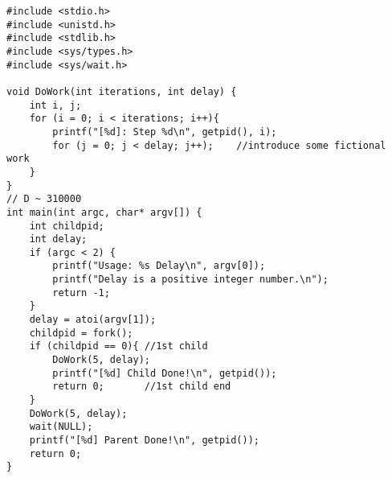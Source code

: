 \documentclass{article}
\begin{document}
\title{}
\author{Wang Xiyu}
\date{}
\maketitle

\begin{lstlisting}
#include <stdio.h>
#include <unistd.h>
#include <stdlib.h>
#include <sys/types.h>
#include <sys/wait.h>

void DoWork(int iterations, int delay) {
    int i, j;
    for (i = 0; i < iterations; i++){
        printf("[%d]: Step %d\n", getpid(), i);
        for (j = 0; j < delay; j++);    //introduce some fictional work
    }
}
// D ~ 310000
int main(int argc, char* argv[]) {
    int childpid;
    int delay;
    if (argc < 2) {
        printf("Usage: %s Delay\n", argv[0]);
        printf("Delay is a positive integer number.\n");
        return -1;
    }
    delay = atoi(argv[1]);
    childpid = fork();
    if (childpid == 0){ //1st child
        DoWork(5, delay);
        printf("[%d] Child Done!\n", getpid());
        return 0;       //1st child end
    }
    DoWork(5, delay);
    wait(NULL);
    printf("[%d] Parent Done!\n", getpid());
    return 0;
}

\end{lstlisting}
\end{document}
